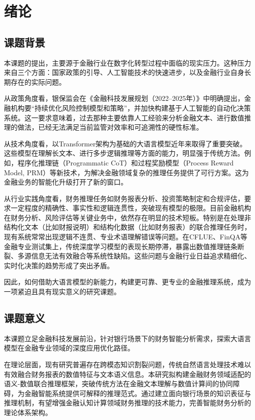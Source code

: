 \documentclass[professional,privacy,print,win,long,STEM,AutoFakeBold]{def/buaa}
\begin{document}
\newpage
\chapter{绪论}
\section{课题背景}
本课题的提出，主要源于金融行业在数字化转型过程中面临的现实压力。这种压力来自三个方面：国家政策的引导、人工智能技术的快速进步，以及金融行业自身长期存在的实际问题。

从政策角度看，银保监会在《金融科技发展规划（2022–2025年）》中明确提出，金融机构要“持续优化风险控制模型和策略”，并加快构建基于人工智能的自动化决策系统。这一要求意味着，过去那种主要依靠人工经验来分析金融文本、进行数值推理的做法，已经无法满足当前监管对效率和可追溯性的硬性标准。

从技术角度看，以Transformer架构为基础的大语言模型近年来取得了重要突破。这些模型在理解长文本、进行多步逻辑推理等方面的能力，明显强于传统方法。例如，程序化推理链（Programmatic CoT）和过程奖励模型（Process Reward Model, PRM）等新技术，为解决金融领域复杂的推理任务提供了可行方案。这为金融业务的智能化升级打开了新的窗口。

从行业实践角度看，财务推理任务如财务报表分析、投资策略制定和合规评估，要求一定程度的精确性、事实性和逻辑连贯性，突破现有模型的极限。目前金融机构在财务分析、风险评估等关键业务中，依然存在明显的技术短板。特别是在处理非结构化文本（比如财报说明）和结构化数据（比如财务报表）的联合推理任务时，现有系统常常出现逻辑不连贯、专业术语理解错误等问题。在CFLUE、FinQA等金融专业测试集上，传统深度学习模型的表现长期停滞，暴露出数值推理链条断裂、多源信息无法有效融合等系统性缺陷。这些问题与金融行业日益追求精细化、实时化决策的趋势形成了突出矛盾。

因此，如何借助大语言模型的新能力，构建更可靠、更专业的金融推理系统，成为一项紧迫且具有现实意义的研究课题。

\section{课题意义}
本课题立足金融科技发展前沿，针对银行场景下的财务智能分析需求，探索大语言模型在金融专业领域的深度应用优化路径。

在理论层面，现有研究普遍存在跨模态知识割裂问题，传统自然语言处理技术难以有效融合财务报表的数值特征与文本语义信息。本研究拟构建金融财务领域适配的语义-数值联合推理框架，突破传统方法在金融文本理解与数值计算间的协同障碍，为金融智能系统提供可解释的推理范式。通过建立面向银行场景的知识表征与推理机制，有望增强金融认知计算领域财务推理的技术能力，完善智能财务分析的理论体系架构。
\end{document}
